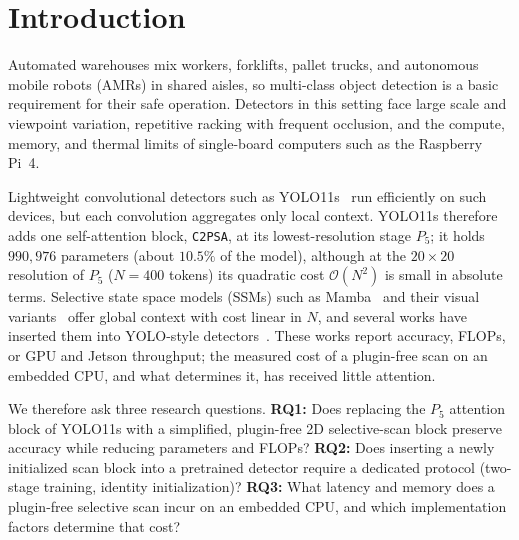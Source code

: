 \section{Introduction}
\label{sec:introduction}
Automated warehouses mix workers, forklifts, pallet trucks, and autonomous mobile robots (AMRs) in shared aisles, so multi-class object detection is a basic requirement for their safe operation. Detectors in this setting face large scale and viewpoint variation, repetitive racking with frequent occlusion, and the compute, memory, and thermal limits of single-board computers such as the Raspberry Pi~4.

Lightweight convolutional detectors such as YOLO11s~\cite{ultralytics2024yolo11} run efficiently on such devices, but each convolution aggregates only local context. YOLO11s therefore adds one self-attention block, \texttt{C2PSA}, at its lowest-resolution stage $P_5$; it holds $990{,}976$ parameters (about $10.5\%$ of the model), although at the $20 \times 20$ resolution of $P_5$ ($N = 400$ tokens) its quadratic cost $\mathcal{O}(N^2)$ is small in absolute terms. Selective state space models (SSMs) such as Mamba~\cite{gu2023mamba} and their visual variants~\cite{liu2024vmamba,zhu2024visionmamba} offer global context with cost linear in $N$, and several works have inserted them into YOLO-style detectors~\cite{wang2025mambayolo,lei2025mambanext,chan2026mambapsa}. These works report accuracy, FLOPs, or GPU and Jetson throughput; the measured cost of a plugin-free scan on an embedded CPU, and what determines it, has received little attention.

We therefore ask three research questions. \textbf{RQ1:} Does replacing the $P_5$ attention block of YOLO11s with a simplified, plugin-free 2D selective-scan block preserve accuracy while reducing parameters and FLOPs? \textbf{RQ2:} Does inserting a newly initialized scan block into a pretrained detector require a dedicated protocol (two-stage training, identity initialization)? \textbf{RQ3:} What latency and memory does a plugin-free selective scan incur on an embedded CPU, and which implementation factors determine that cost?

